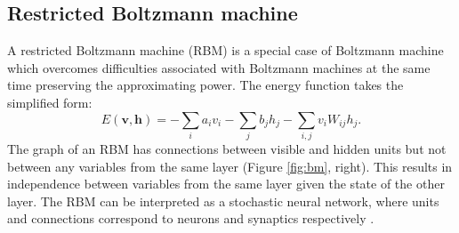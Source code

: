 \subsection{Restricted Boltzmann machine}
A restricted Boltzmann machine (RBM) is a special case of Boltzmann machine which overcomes difficulties associated with Boltzmann machines at the same time preserving the approximating power. The energy function takes the simplified form:
$$ E (\mathbf{v,h}) = - \sum_i a_i v_i - \sum_j b_j h_j - \sum_{i,j} v_i W_{ij}h_j.$$
The graph of an RBM has connections between visible and hidden units but not between any variables from the same layer (Figure \ref{fig:bm}, right). This results in independence between variables from the same layer given the state of the other layer. The RBM can be interpreted as a stochastic neural network, where units and connections correspond to neurons and synaptics respectively \cite{fischer2012introduction}.

